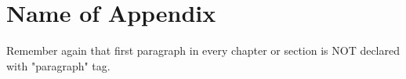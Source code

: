\chapter{Name of Appendix}

Remember again that first paragraph in every chapter or section is NOT declared with "paragraph" tag.